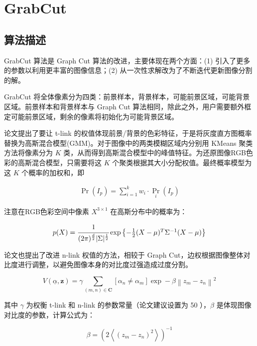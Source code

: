 \documentclass[lang=cn,11pt,a4paper]{elegantpaper}
\begin{document}
\section{GrabCut}

\subsection{算法描述}

GrabCut 算法是 Graph Cut 算法的改进，主要体现在两个方面：(1)  引入了更多的参数以利用更丰富的图像信息；(2)  从一次性求解改为了不断迭代更新图像分割的解。

GrabCut 将全体像素分为四类：前景样本，背景样本，可能前景区域，可能背景区域。前景样本和背景样本与 Graph Cut 算法相同，除此之外，用户需要额外框定可能前景区域，剩余的像素将初始化为可能背景区域。

论文提出了要让 t-link 的权值体现前景/背景的色彩特征，于是将灰度直方图概率替换为高斯混合模型(GMM)。对于图像中的两类模糊区域内分别用 KMeans 聚类方法将像素分为 $K$ 类，从而得到高斯混合模型中的峰值特征。为还原图像RGB色彩的高斯混合模型，只需要将这 $K$ 个聚类根据其大小分配权值。最终概率模型为这 $K$ 个概率的加权和，即

$$
\begin{array}{l}
\operatorname{Pr}(I_{p}) =  \sum\limits_{i=1}^{k} w_i \cdot \operatorname{Pr}_{i}(I_{p})
\end{array}
$$

注意在RGB色彩空间中像素 $X^{3\times1}$ 在高斯分布中的概率为：

$$
\begin{array}{l}
p(X)=\cfrac{1}{(2 \pi)^{\frac{d}{2}}|\Sigma|^{\frac{1}{2}}} \exp \left\{-\frac{1}{2}(X-\mu)^{T} \Sigma^{-1}(X-\mu)\right\}
\end{array}
$$

论文也提出了改进 n-link 权值的方法，相较于 Graph Cut，边权根据图像整体对比度进行调整，以避免图像本身的对比度过强造成过度分割。

\begin{equation}
    V(\underline{\alpha}, \mathbf{z})=\gamma \sum_{(m, n) \in \mathbf{C}}\left[\alpha_{n} \neq \alpha_{m}\right] \exp -\beta\left\|z_{m}-z_{n}\right\|^{2}
\end{equation}

其中 $\gamma$ 为权衡 t-link 和 n-link 的参数常量（论文建议设置为 50 ），$\beta$ 是体现图像对比度的参数，计算公式为：

\begin{equation}
    \beta=\left(2\left\langle\left(z_{m}-z_{n}\right)^{2}\right\rangle\right)^{-1}
\end{equation}
\end{document}
